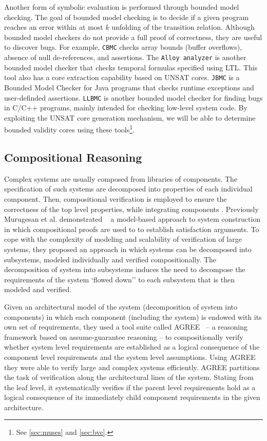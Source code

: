 Another form of symbolic evaluation is performed through bounded model checking.
The goal of bounded model checking is to decide if a given program reaches an error within at
most $k$ unfolding of the transition relation. Although bounded model checkers do not provide a full proof of correctness, they are useful to discover bugs. For example, \texttt{CBMC} \cite{cbmc} checks array bounds (buffer overflows), absence of
null de-references, and assertions. The \texttt{Alloy analyzer} \cite{alloy} is another bounded model checker that checks temporal formulas specified using LTL. This tool also has a core extraction capability based on UNSAT cores. \texttt{JBMC} \cite{jbmc} is a Bounded Model Checker for Java programs that checks runtime exceptions and user-definded assertions. \texttt{LLBMC} is another bounded model checker for finding bugs in C/C++ programs, mainly intended for checking low-level system code. By exploiting the UNSAT core generation mechanism, we will be able to determine bounded validity cores using these tools\footnote{See \ref{sec:muses} and \ref{sec:bvc}.}.

\subsection{Compositional Reasoning}
Complex systems are usually composed from libraries of components. The specification of such systems are decomposed into properties of each individual component. Then, compositional verification is employed to ensure the correctness of the top level properties, while integrating components \cite{NFM2012:CoGaMiWhLaLu}. Previously Murugesan et al. demonstrated ~\cite{hilt2013} a model-based approach to system construction in which compositional proofs are used to to establish satisfaction arguments. To cope with the complexity of modeling and scalability of verification of large systems,
they proposed an approach in which systems can be decomposed into subsystems, modeled individually and verified compositionally. The decomposition of system into subsystems induces the need to decompose the requirements of the system `flowed down'' to each subsystem that is then modeled and verified.

Given an architectural model of the system (decomposition of system into components) in which each component (including the system) is endowed with its own set of requirements,
 they used a tool suite called AGREE~\cite{NFM2012:CoGaMiWhLaLu} -- a reasoning framework based on assume-guarantee reasoning -- to compositionally verify whether system level requirements are established as a logical consequence of the component level requirements and the system level assumptions.
 Using AGREE they were able to verify large and complex systems efficiently. AGREE partitions the task of verification along the architectural lines of the system. Stating from the leaf level, it systematically verifies if the parent level requirements hold as a logical consequence of its immediately child component requirements in the given architecture.

